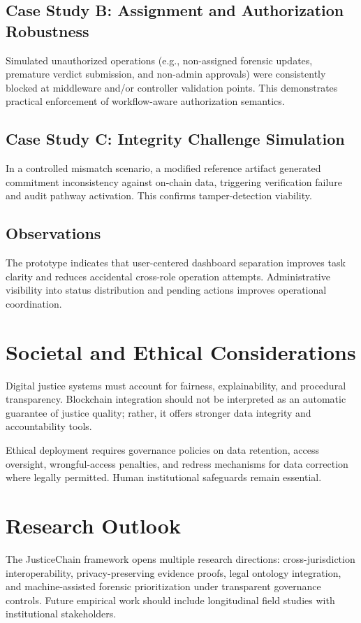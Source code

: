 \documentclass[conference]{IEEEtran}
\begin{document}
\subsection{Case Study B: Assignment and Authorization Robustness}
Simulated unauthorized operations (e.g., non-assigned forensic updates, premature verdict submission, and non-admin approvals) were consistently blocked at middleware and/or controller validation points. This demonstrates practical enforcement of workflow-aware authorization semantics.

\subsection{Case Study C: Integrity Challenge Simulation}
In a controlled mismatch scenario, a modified reference artifact generated commitment inconsistency against on-chain data, triggering verification failure and audit pathway activation. This confirms tamper-detection viability.

\subsection{Observations}
The prototype indicates that user-centered dashboard separation improves task clarity and reduces accidental cross-role operation attempts. Administrative visibility into status distribution and pending actions improves operational coordination.

\section{Societal and Ethical Considerations}
Digital justice systems must account for fairness, explainability, and procedural transparency. Blockchain integration should not be interpreted as an automatic guarantee of justice quality; rather, it offers stronger data integrity and accountability tools.

Ethical deployment requires governance policies on data retention, access oversight, wrongful-access penalties, and redress mechanisms for data correction where legally permitted. Human institutional safeguards remain essential.

\section{Research Outlook}
The JusticeChain framework opens multiple research directions: cross-jurisdiction interoperability, privacy-preserving evidence proofs, legal ontology integration, and machine-assisted forensic prioritization under transparent governance controls. Future empirical work should include longitudinal field studies with institutional stakeholders.
\end{document}
